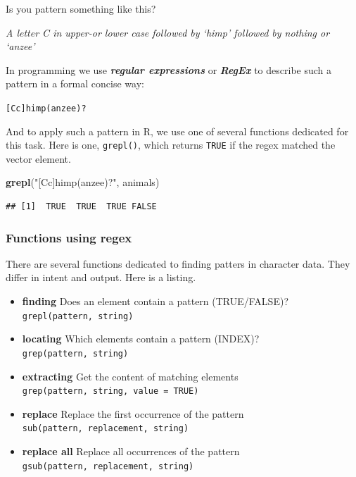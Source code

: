 \documentclass[]{book}
\newenvironment{Shaded}{\begin{snugshade}}{\end{snugshade}}
\newcommand{\KeywordTok}[1]{\textcolor[rgb]{0.13,0.29,0.53}{\textbf{#1}}}
\newcommand{\NormalTok}[1]{#1}
\newcommand{\StringTok}[1]{\textcolor[rgb]{0.31,0.60,0.02}{#1}}
\providecommand{\tightlist}{%
  \setlength{\itemsep}{0pt}\setlength{\parskip}{0pt}}
\begin{document}
Is you pattern something like this?

\emph{A letter C in upper-or lower case followed by `himp' followed by nothing or `anzee'}

In programming we use \textbf{\emph{regular expressions}} or \textbf{\emph{RegEx}} to describe such a pattern in a formal concise way:

\texttt{{[}Cc{]}himp(anzee)?}

And to apply such a pattern in R, we use one of several functions dedicated for this task. Here is one, \texttt{grepl()}, which returns \texttt{TRUE} if the regex matched the vector element.

\begin{Shaded}
\begin{Highlighting}[]
\KeywordTok{grepl}\NormalTok{(}\StringTok{"[Cc]himp(anzee)?"}\NormalTok{, animals)}
\end{Highlighting}
\end{Shaded}

\begin{verbatim}
## [1]  TRUE  TRUE  TRUE FALSE
\end{verbatim}

\hypertarget{functions-using-regex}{%
\subsubsection*{Functions using regex}\label{functions-using-regex}}

There are several functions dedicated to finding patters in character data. They differ in intent and output. Here is a listing.

\begin{itemize}
\tightlist
\item
  \textbf{finding} Does an element contain a pattern (TRUE/FALSE)? \texttt{grepl(pattern,\ string)}
\item
  \textbf{locating} Which elements contain a pattern (INDEX)? \texttt{grep(pattern,\ string)}
\item
  \textbf{extracting} Get the content of matching elements \texttt{grep(pattern,\ string,\ value\ =\ TRUE)}
\item
  \textbf{replace} Replace the first occurrence of the pattern \texttt{sub(pattern,\ replacement,\ string)}
\item
  \textbf{replace all} Replace all occurrences of the pattern \texttt{gsub(pattern,\ replacement,\ string)}
\end{itemize}
\end{document}
